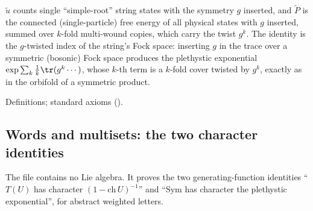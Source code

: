 \begin{physics}
$\tilde u$ counts single ``simple-root'' string states with the symmetry $g$ inserted, and $\tilde P$ is the connected
(single-particle) free energy of all physical states with $g$ inserted, summed over $k$-fold multi-wound copies, which carry
the twist $g^k$.  The identity is the $g$-twisted index of the string's Fock space: inserting $g$ in the trace over a
symmetric (bosonic) Fock space produces the plethystic exponential $\exp\sum_k\frac1k\tr(g^k\cdots)$, whose $k$-th term is a
$k$-fold cover twisted by $g^k$, exactly as in the orbifold of a symmetric product.
\end{physics}
\begin{status}Definitions; standard axioms ().\end{status}

\subsection{Words and multisets: the two character identities}

The file  contains no Lie algebra.  It proves the two
generating-function identities ``$T(U)$ has character $(1-\mathrm{ch}\,U)^{-1}$'' and ``$\mathrm{Sym}$ has character the plethystic
exponential'', for abstract weighted letters.

